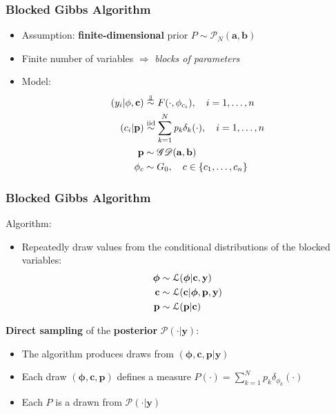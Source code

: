 \begin{frame}
	\frametitle{Blocked Gibbs Algorithm}
	\begin{itemize}
	    \item Assumption: \textbf{finite-dimensional} prior $P \sim  \mathscr{P}_{N}(\mathbf{a},\mathbf{b})$
        \item Finite number of variables $\Rightarrow$ \textit{blocks of parameters}
        \item Model:
        \begin{align*}
            (y_{i}|\mathbf{\phi},\mathbf{c})&\indsim F(\cdot,\phi_{c_{i}}), \quad i=1,\dots,n \\
            (c_{i}|\mathbf{p})&\iidsim\sum\limits_{k=1}^N \mathit{p_{k}}\delta_{k}(\cdot), \quad i=1,\dots,n \\
            \mathbf{p} &\sim \mathscr{GD}(\mathbf{a},\mathbf{b}) \\
            \mathbf{\phi}_{c} & \sim G_{0}, \quad c \in \{c_1,\dots, c_n\}
        \end{align*}



	\end{itemize}
\end{frame}




\begin{frame}
	\frametitle{Blocked Gibbs Algorithm}
	Algorithm:
	\begin{itemize}
		\item Repeatedly draw values from the conditional distributions of the blocked variables:
		\begin{align*}
			\boldsymbol\phi &\sim \mathcal L(\boldsymbol\phi | \mathbf{c}, \mathbf{y}) \\
			\mathbf{c} &\sim \mathcal L (\mathbf{c}| \boldsymbol\phi,\mathbf{p}, \mathbf{y}) \\
			\mathbf{p} &\sim \mathcal L (\mathbf{p}| \mathbf{c})
		\end{align*}
	\end{itemize}
	\textbf{Direct sampling} of the \textbf{posterior} $\mathscr{P}(\cdot|\mathbf{y})$:
	\begin{itemize}
    	\item The algorithm produces draws from $(\boldsymbol\phi,\mathbf{c},\mathbf{p}| \mathbf{y})$
		\item Each draw $(\boldsymbol\phi,\mathbf{c},\mathbf{p})$ defines a measure $P(\cdot)= \sum\limits_{k=1}^N  \mathit{p_{k}}\delta_{\phi_{k}}(\cdot) $ %
		\item Each $P$ is a drawn from $\mathscr{P}(\cdot|\mathbf{y})$
	\end{itemize}
\end{frame}

